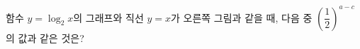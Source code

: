 \noindent\begin{minipage}[t]{0.58\linewidth}\vspace{0pt}\raggedright 함수 $y=\log_2 x$의 그래프와 직선 $y=x$가 오른쪽 그림과 같을 때, 다음 중 $\left(\dfrac{1}{2}\right)^{a-c}$의 값과 같은 것은? \end{minipage}\hfill\begin{minipage}[t]{0.4\linewidth}\vspace{0pt}\centering \resizebox{\ifdim\width>\linewidth\linewidth\else\width\fi}{!}{}\end{minipage}\par
{}
